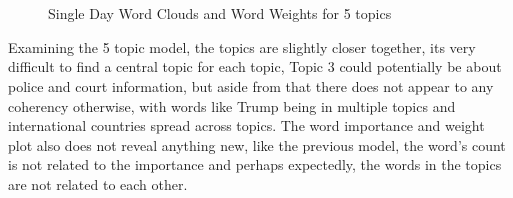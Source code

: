 \begin{figure}[H]
	\centering
	\\
	\\
	
	\caption{Single Day Word Clouds and Word Weights for 5 topics}
	\label{fig:single5}
\end{figure}	

Examining the 5 topic model, the topics are slightly closer together, its very difficult to find a central topic for each topic, Topic 3 could potentially be about police and court information, but aside from that there does not appear to any coherency otherwise, with words like Trump being in multiple topics and international countries spread across topics. The word importance and weight plot also does not reveal anything new, like the previous model, the word's count is not related to the importance and perhaps expectedly, the words in the topics are not related to each other.

